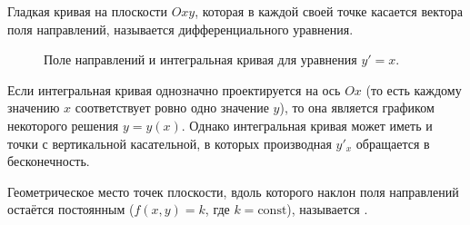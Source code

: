 \begin{definition}
    Гладкая кривая на плоскости $Oxy$, которая в каждой своей точке касается
    вектора поля направлений, называется 
    дифференциального уравнения.
\end{definition}

\begin{figure}[H]
    \centering
    \caption{Поле направлений и интегральная кривая для уравнения $y' = x$.}
\end{figure}

\begin{remark}
    Если интегральная кривая однозначно проектируется на ось $Ox$ (то есть
    каждому значению $x$ соответствует ровно одно значение $y$), то она
    является графиком некоторого решения $y = y(x)$. Однако интегральная
    кривая может иметь и точки с вертикальной касательной, в которых
    производная $y'_x$ обращается в бесконечность.
\end{remark}

\begin{definition}
    Геометрическое место точек плоскости, вдоль которого наклон поля
    направлений остаётся постоянным ($f(x, y) = k$, где $k = \text{const}$),
    называется .
\end{definition}

